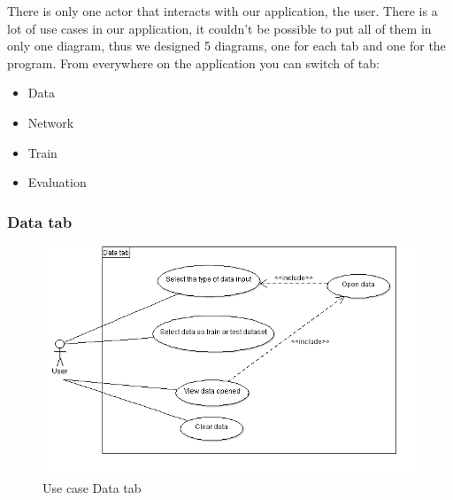 There is only one actor that interacts with our application, the user.
There is a lot of use cases in our application, it couldn't be possible to put all of them in only one diagram, thus we designed 5 diagrams, one for each tab and one for the program.
\newline
From everywhere on the application you can switch of tab:
\begin{itemize}
    \item Data
    \item Network
    \item Train
    \item Evaluation
\end{itemize}

\pagebreak

    \subsubsection{Data tab}
    \begin{figure}[htbp]
        \centering 
        \includegraphics[width=\textwidth]{figures/dcuData.png}
        \caption{Use case Data tab}
    \end{figure}

\pagebreak

